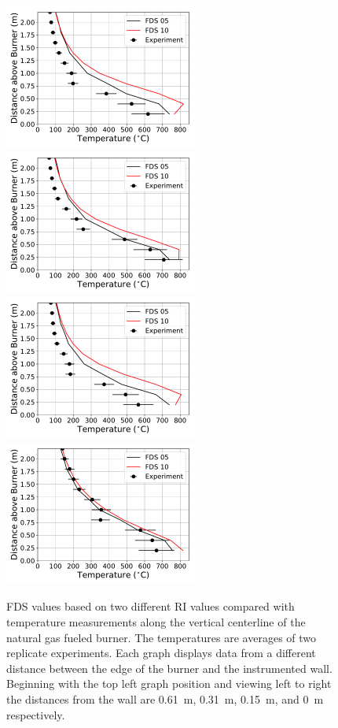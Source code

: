 \documentclass[twoside]{uocthesis}
\begin{document}
{ \begin{figure}[ht!]
  \centering
  \includegraphics[width=2.5in]{../Figures/IWGB_NG_TC_Plume_Avg_2D_RF_RI}
  \includegraphics[width=2.5in]{../Figures/IWGB_NG_TC_Plume_Avg_1D_RF_RI}\\
  \includegraphics[width=2.5in]{../Figures/IWGB_NG_TC_Plume_Avg_0p5D_RF_RI}
  \includegraphics[width=2.5in]{../Figures/IWGB_NG_TC_Plume_Avg_0D_RF_RI}\\
  \caption[FDS values based on two different RI values compared with temperature measurements along the vertical centerline of the natural gas fueled burner]{FDS values based on two different RI values compared with temperature measurements along the vertical centerline of the natural gas fueled burner. The temperatures are averages of two replicate experiments. Each graph displays data from a different distance between the edge of the burner and the instrumented wall.  Beginning with the top left graph position and viewing left to right the distances from the wall are 0.61~m, 0.31~m, 0.15~m, and 0~m respectively.}
  \label{FDS_Plume_IWGB_comp}
\end{figure}

}
\end{document}
